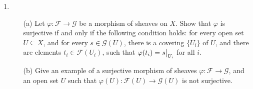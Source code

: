 \documentclass{article}
\newcommand{\fG}{\mathscr{G}}
\DeclareMathOperator{\im}{im}
\newcommand\restr[2]{{%
  \left.\kern-\nulldelimiterspace %
  #1 %
  \vphantom{\big|} %
  \right|_{#2} %
}}
\begin{document}
\begin{enumerate} [label=\textbf{\arabic*.}, leftmargin=0em]
\begin{proof} $ $ \vspace{0pt}
    \begin{itemize} [leftmargin=0cm]
        \item[(a)] It is true in general that kernels commute with limits and cokernels commmute with colimits in any abelian category, since kernels and cokernels can be realized as limits and colimits, respectively.

        \item[(b)] $\varphi$ is injective $\iff$ $\ker{\varphi} = 0$ $\iff$ $(\ker{\varphi})_P = 0$ $\iff$ $\ker{\varphi_P} = 0$.
        
        $\varphi$ is surjective $\iff$ $\im{\varphi} = \fG$ $\iff$ $\im(\varphi_P) = (\im{\varphi})_P = \fG_P$.

        \item[(c)] The sequence $\dots \to \mathscr{F}^{i - 1} \xrightarrow{\varphi^{i - 1}} \mathscr{F}^i \xrightarrow{\varphi^i} \mathscr{F}^{i + 1} \to \dots$ is exact $\iff$ $\im{\varphi^{i - 1}} = \ker{\varphi^i}$ for all $i$ $\iff$ $(\im{\varphi^{i - 1}})_P = (\ker{\varphi^i})_P$ for all $i$ and $P \in X$ $\iff$ $\im(\varphi^{i - 1}_P) = \ker(\varphi^i_P)$ for all $i$ and $P \in X$ by part (a) above.
    \end{itemize}
\end{proof}

\item \begin{itemize}
    \item[(a)] Let $\varphi : \mathscr{F} \to \mathscr{G}$ be a morphism of sheaves on $X$. Show that $\varphi$ is surjective if and only if the following condition holds: for every open set $U \subseteq X$, and for every $s \in \mathscr{G}(U)$, there is a covering $\{ U_i \}$ of $U$, and there are elements $t_i \in \mathscr{F}(U_i)$, such that $\varphi(t_i) = \restr{s}{U_i}$ for all $i$.
    \item[(b)] Give an example of a surjective morphism of sheaves $\varphi : \mathscr{F} \to \mathscr{G}$, and an open set $U$ such that $\varphi(U) : \mathscr{F}(U) \to \mathscr{G}(U)$ is not surjective.
\end{itemize}


\end{enumerate}
\end{document}
